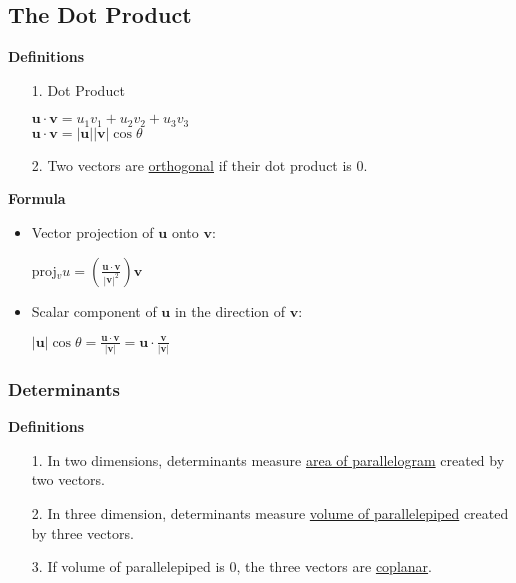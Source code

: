 \documentclass[10pt, twocolumn]{article}
\begin{document}
\subsection{The Dot Product}
{\bf Definitions}
\begin{enumerate}
\item[1.]{Dot Product}
\begin{center}
$\mathbf{u} \cdot \mathbf{v} = u_1v_1+u_2v_2+u_3v_3$ \\
$\mathbf{u} \cdot \mathbf{v} = |\mathbf{u}||\mathbf{v}|\cos\theta$
\end{center}
\item[2.]{Two vectors are \underline{orthogonal} if their dot product is 0.}
\end{enumerate}
{\bf Formula}
\begin{itemize}
\item Vector projection of $\mathbf{u}$ onto $\mathbf{v}$:
\begin{center}
proj$_vu = (\frac{\mathbf{u} \cdot \mathbf{v}}{|\mathbf{v}|^2})\mathbf{v}$
\end{center}
\item Scalar component of $\mathbf{u}$ in the direction of $\mathbf{v}$:
\begin{center}
$|\mathbf{u}|\cos\theta = \frac{\mathbf{u} \cdot \mathbf{v}}{|\mathbf{v}|} = \mathbf{u} \cdot \frac{\mathbf{v}}{|\mathbf{v}|}$
\end{center}
\end{itemize}

\subsubsection{Determinants}
{\bf Definitions}
\begin{enumerate}
\item[1.]{In two dimensions, determinants measure \underline{area of parallelogram} created by two vectors.}
\item[2.]{In three dimension, determinants measure \underline{volume of parallelepiped} created by three vectors.}
\item[3.]{If volume of parallelepiped is $0$, the three vectors are \underline{coplanar}.}
\end{enumerate}
\end{document}
